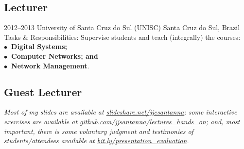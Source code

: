 \documentclass[print]{styles/friggeri-cv-mac} %
\begin{document}
\newpage
\subsection{Lecturer}\vspace{-5pt}
\begin{entrylist}
\entry
{2012--2013}
{University of Santa Cruz do Sul (UNISC)}
{Santa Cruz do Sul, Brazil}
{Tasks \& Responsibilities: Supervise students and teach (integrally) the courses: \\
	\textbf{$\bullet$~Digital Systems;\\$\bullet$~Computer Networks; and\\$\bullet$~Network Management}.} 
\end{entrylist}

\subsection{Guest Lecturer}\vspace{-5pt}

\textit{Most of my slides are available at
\href{http://www.slideshare.net/jjcsantanna}{slideshare.net/jjcsantanna}; some
interactive exercises are available at
\href{https://github.com/jjsantanna/lectures_hands_on}{github.com/jjsantanna/lectures\_hands\_on};
and, most important, there is some voluntary judgment and testimonies of students/attendees available at
\href{http://bit.ly/presentation_evaluation}{bit.ly/presentation\_evaluation}.}
\end{document}
